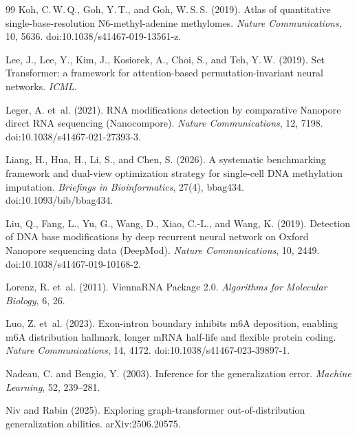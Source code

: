 \documentclass[11pt,a4paper]{article}
\begin{document}
\begin{thebibliography}{99}
    Koh, C.\,W.\,Q., Goh, Y.\,T., and Goh, W.\,S.\,S. (2019).
    \newblock Atlas of quantitative single-base-resolution N6-methyl-adenine methylomes.
    \newblock \textit{Nature Communications}, 10, 5636. doi:10.1038/s41467-019-13561-z.

    Lee, J., Lee, Y., Kim, J., Kosiorek, A., Choi, S., and Teh, Y.\,W. (2019).
    \newblock Set Transformer: a framework for attention-based permutation-invariant neural networks.
    \newblock \textit{ICML}.

    Leger, A. et~al. (2021).
    \newblock RNA modifications detection by comparative Nanopore direct RNA sequencing (Nanocompore).
    \newblock \textit{Nature Communications}, 12, 7198. doi:10.1038/s41467-021-27393-3.

    Liang, H., Hua, H., Li, S., and Chen, S. (2026).
    \newblock A systematic benchmarking framework and dual-view optimization strategy for single-cell DNA methylation imputation.
    \newblock \textit{Briefings in Bioinformatics}, 27(4), bbag434. doi:10.1093/bib/bbag434.

    Liu, Q., Fang, L., Yu, G., Wang, D., Xiao, C.-L., and Wang, K. (2019).
    \newblock Detection of DNA base modifications by deep recurrent neural network on Oxford Nanopore sequencing data (DeepMod).
    \newblock \textit{Nature Communications}, 10, 2449. doi:10.1038/s41467-019-10168-2.

    Lorenz, R. et~al. (2011).
    \newblock ViennaRNA Package 2.0.
    \newblock \textit{Algorithms for Molecular Biology}, 6, 26.

    Luo, Z. et~al. (2023).
    \newblock Exon-intron boundary inhibits m6A deposition, enabling m6A distribution hallmark, longer mRNA half-life and flexible protein coding.
    \newblock \textit{Nature Communications}, 14, 4172. doi:10.1038/s41467-023-39897-1.

    Nadeau, C. and Bengio, Y. (2003).
    \newblock Inference for the generalization error.
    \newblock \textit{Machine Learning}, 52, 239--281.

    Niv and Rabin (2025).
    \newblock Exploring graph-transformer out-of-distribution generalization abilities.
    \newblock arXiv:2506.20575.


\end{thebibliography}
\end{document}
